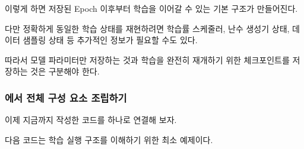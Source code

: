 이렇게 하면 저장된 Epoch 이후부터 학습을 이어갈 수 있는 기본 구조가 만들어진다.

다만 정확하게 동일한 학습 상태를 재현하려면 학습률 스케줄러, 난수 생성기 상태, 데이터 샘플링 상태 등 추가적인 정보가 필요할 수도 있다.

따라서 모델 파라미터만 저장하는 것과 학습을 완전히 재개하기 위한 체크포인트를 저장하는 것은 구분해야 한다.

\subsubsection{에서 전체 구성 요소 조립하기}

이제 지금까지 작성한 코드를 하나로 연결해 보자.

다음 코드는 학습 실행 구조를 이해하기 위한 최소 예제이다.

